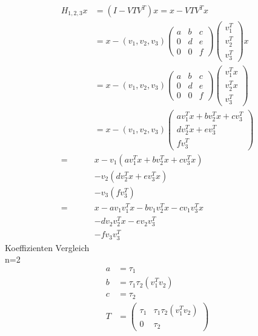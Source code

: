 \begin{align*}
  H_{1,2,3} x &= (I - V T V^T) x = x - V T V^T x\\
  &= x - (v_1, v_2, v_3)
  \begin{pmatrix}
    a & b & c\\ 
    0 & d & e\\
    0 & 0 & f
  \end{pmatrix}
  \begin{pmatrix}
    v_1^T \\ v_2^T \\ v_3^T
  \end{pmatrix}
  x\\
  &= x - (v_1, v_2, v_3)
  \begin{pmatrix}
    a & b & c\\ 
    0 & d & e\\
    0 & 0 & f
  \end{pmatrix}
  \begin{pmatrix}
    v_1^T x \\ v_2^T x \\ v_3^T
  \end{pmatrix}\\
  &= x - (v_1, v_2, v_3)
  \begin{pmatrix}
    a v_1^T x + b v_2^T x + c v_3^T\\ 
    d v_2^T x + e v_3^T \\
    f v_3^T
  \end{pmatrix}\\
  =& x - v_1(a v_1^T x + b v_2^T x + c v_3^T x) \\ 
   & - v_2 ( d v_2^T x + e v_3^T x) \\ 
   & - v_3 ( f v_3^T ) \\
  =& x - a v_1 v_1^T x - b v_1 v_2^T x - c v_1 v_3^T x \\
   & - d v_2 v_2^T x - e v_2 v_3^T \\
   & - f v_3 v_3^T
\end{align*}
Koeffizienten Vergleich\\
n=2
\begin{align*}
  a &= \tau_1 \\
	b &= \tau_1 \tau_2 (v_1^T v_2) \\
	c &= \tau_2 \\
  T &=
  \begin{pmatrix}
    \tau_1 & \tau_1 \tau_2 (v_1^T v_2)\\ 0 & \tau_2
  \end{pmatrix}
\end{align*}

